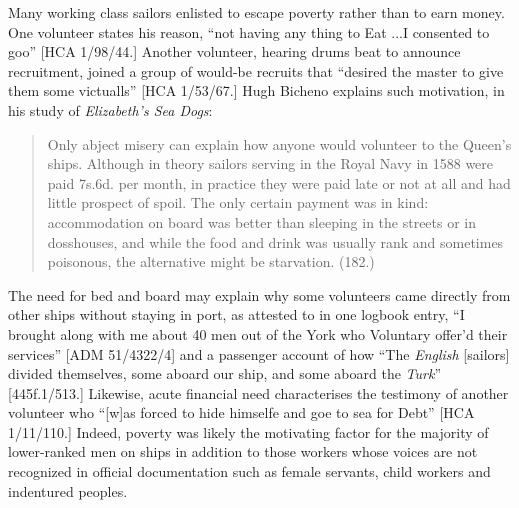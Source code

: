    Many working class sailors enlisted to escape poverty rather than to earn money. One volunteer states his reason, “not having any thing to Eat ...I consented to goo” [HCA 1/98/44.] Another volunteer, hearing drums beat to announce recruitment, joined a group of would-be recruits that “desired the master to give them some victualls” [HCA 1/53/67.] Hugh Bicheno explains such motivation, in his \citeyear*{Bicheno2012} study of \textit{Elizabeth’s Sea Dogs}:

\begin{quotation}
Only abject misery can explain how anyone would volunteer to  the Queen’s ships. Although in theory sailors serving in the Royal Navy in 1588 were paid 7s.6d. per month, in practice they were paid late or not at all and had little prospect of spoil. The only certain payment was in kind: accommodation on board was better than sleeping in the streets or in dosshouses, and while the food and drink was usually rank and sometimes poisonous, the alternative might be starvation. (182.)\end{quotation}

The need for bed and board may explain why some volunteers came directly from other ships without staying in port, as attested to in one logbook entry, “I brought along with me about 40 men out of the York who Voluntary offer’d their services” [ADM 51/4322/4] and a passenger account of how “The \textit{English} [sailors] divided themselves, some aboard our ship, and some aboard the \textit{Turk}” [445f.1/513.] Likewise, acute financial need characterises the testimony of another volunteer who “[w]as forced to hide himselfe and goe to sea for Debt” [HCA 1/11/110.] Indeed, poverty was likely the motivating factor for the majority of lower-ranked men on ships in addition to those workers whose voices are not recognized in official documentation such as female servants, child workers and indentured peoples.

